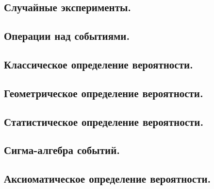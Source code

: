 \subsection{Случайные эксперименты.}
 


\newpage
\subsection{Операции над событиями.}
 


\newpage
\subsection{Классическое определение вероятности.}



\newpage
\subsection{Геометрическое определение вероятности.}



\newpage
\subsection{Статистическое определение вероятности.}



\newpage
\subsection{Сигма-алгебра событий.}



\newpage
\subsection{Аксиоматическое определение вероятности.}

